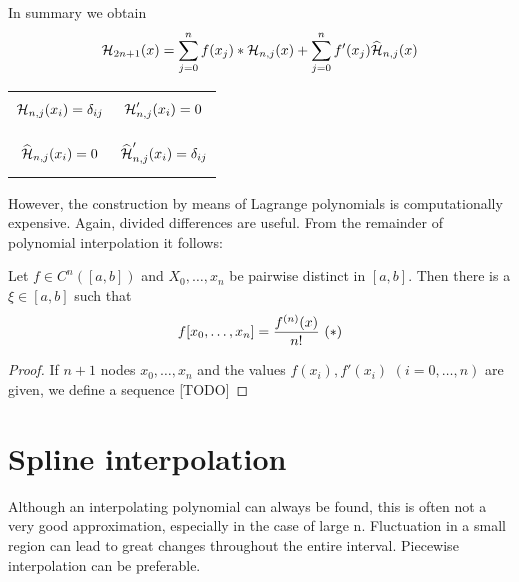 In summary we obtain
\begin{align*}
    \operatorname{\mathcal{H}}_{2n+1}(x) = \sum_{j=0}^{n} f(x_j)*\operatorname{\mathcal{H}}_{n,j}(x)+ \sum_{j=0}^{n} f'(x_j) \widehat{\operatorname{\mathcal{H}}}_{n,j}(x)
\end{align*}
\begin{center}
    \begin{tabular}{c c}
        \[ \operatorname{\mathcal{H}}_{n,j}(x_i) = \delta_{ij}\] & \[\operatorname{\mathcal{H}}_{n,j}'(x_i) = 0\]                      \\
        \[ \widehat{\operatorname{\mathcal{H}}}_{n,j}(x_i) = 0\] & \[ \widehat{\operatorname{\mathcal{H}}}_{n,j}'(x_i) = \delta_{ij}\]
    \end{tabular}
\end{center}
However, the construction by means of Lagrange polynomials is computationally expensive.
Again, divided differences are useful.
From the remainder of polynomial interpolation it follows:
\begin{lemma}
    Let $f \in C^n([a,b])$ and $X_0, \ldots, x_n$ be pairwise distinct in $[a,b]$.
    Then there is a $\xi \in [a,b]$ such that
    \begin{equation*}
        f[x_0,\ldots, x_n] = \frac{f^{(n)}(x)}{n!} \text{ (\textasteriskcentered)}
    \end{equation*}
\end{lemma}
\begin{proof}
    If $n+1$ nodes $x_0, \ldots, x_n$ and the values $f(x_i), f'(x_i)$ $(i=0, \ldots, n)$ are given, we define a sequence [TODO]
\end{proof}


\section{Spline interpolation}\label{sec:spline-interpolation}
Although an interpolating polynomial can always be found, this is often not a very good approximation, especially in the case of large n.
Fluctuation in a small region can lead to great changes throughout the entire interval.
Piecewise interpolation can be preferable.

